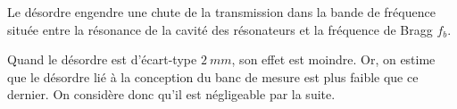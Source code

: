 Le désordre engendre une chute de la transmission dans la bande de fréquence située entre la résonance de la cavité des résonateurs et la fréquence de Bragg $f_b$. 

Quand le désordre est d'écart-type $2~mm$, son effet est moindre. Or, on estime que le désordre lié à la conception du banc de mesure est plus faible que ce dernier. On considère donc qu'il est négligeable par la suite.



